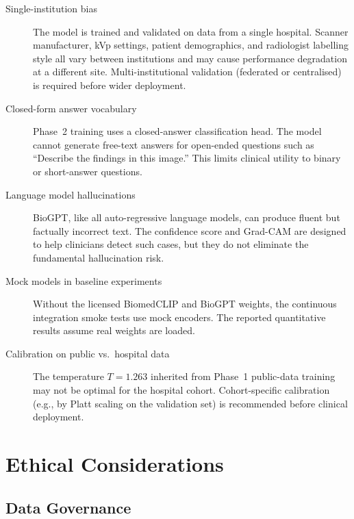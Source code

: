 \begin{description}
  \item[Single-institution bias] The model is trained and validated on
        data from a single hospital. Scanner manufacturer, kVp settings,
        patient demographics, and radiologist labelling style all vary
        between institutions and may cause performance degradation at a
        different site. Multi-institutional validation (federated or
        centralised) is required before wider deployment.

  \item[Closed-form answer vocabulary] Phase~2 training uses a
        closed-answer classification head. The model cannot generate
        free-text answers for open-ended questions such as
        ``Describe the findings in this image.'' This limits clinical
        utility to binary or short-answer questions.

  \item[Language model hallucinations] BioGPT, like all auto-regressive
        language models, can produce fluent but factually incorrect text.
        The confidence score and Grad-CAM are designed to help clinicians
        detect such cases, but they do not eliminate the fundamental
        hallucination risk.

  \item[Mock models in baseline experiments] Without the licensed
        BiomedCLIP and BioGPT weights, the continuous integration
        smoke tests use mock encoders. The reported quantitative results
        assume real weights are loaded.

  \item[Calibration on public vs.\ hospital data] The temperature
        $T=1.263$ inherited from Phase~1 public-data training may not
        be optimal for the hospital cohort. Cohort-specific calibration
        (e.g., by Platt scaling on the validation set) is recommended
        before clinical deployment.
\end{description}

\section{Ethical Considerations}
\label{sec:ethics}

\subsection{Data Governance}
\label{subsec:data_governance}

